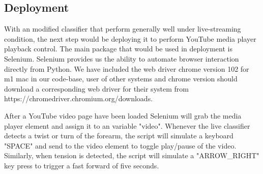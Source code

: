 \documentclass[oneside]{article}
\begin{document}
\subsection{Deployment}
With an modified classifier that perform generally well under live-streaming condition, the next step would be deploying it to perform YouTube media player playback control.
The main package that would be used in deployment is Selenium. Selenium provides us the ability to automate browser interaction directly from Python.  
We have included the web driver chrome version 102 for m1 mac in our code-base, user of other systems and chrome version should download a corresponding web driver for their system from https://chromedriver.chromium.org/downloads.

After a YouTube video page have been loaded Selenium will grab the media player element and assign it to an variable "video".
Whenever the live classifier detects a twist or turn of the forearm, the script will simulate a keyboard "SPACE" and send to the video element to toggle play/pause of the video. Similarly, when tension is detected, the script will simulate a "ARROW\_RIGHT" key press to trigger a fast forward of five seconds.
\end{document}
